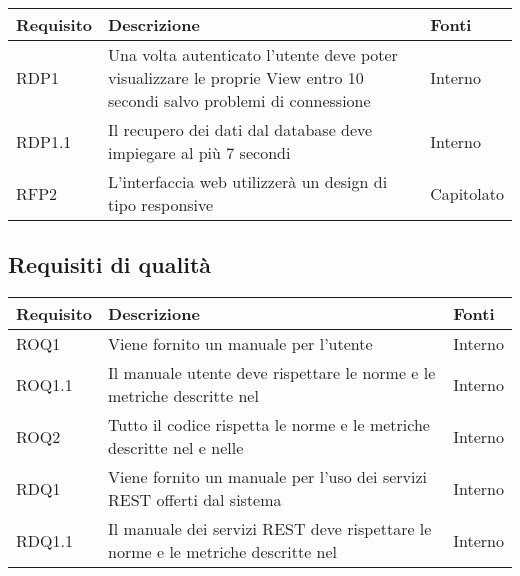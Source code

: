 \begin{center}

	\def\arraystretch{1.5}
	\bgroup
	\begin{longtable}{| p{2.5cm} | p{8cm} | p{2cm} |}

		\hline
		\textbf{Requisito} & \textbf{Descrizione} & \textbf{Fonti} \\
		\hline

		RDP1  &  Una volta autenticato l'utente deve poter visualizzare le proprie View entro 10 secondi salvo problemi di connessione &  Interno \\
		\hline
		RDP1.1  &  Il recupero dei dati dal database deve impiegare al più 7 secondi  &  Interno \\
		\hline
		RFP2  &  L'interfaccia web utilizzerà un design di tipo responsive  &  Capitolato \\
		\hline

	\end{longtable}
	\egroup
\end{center}

\subsection{Requisiti di qualità}

\begin{center}

	\def\arraystretch{1.5}
	\bgroup
	\begin{longtable}{| p{2.5cm} | p{8cm} | p{2cm} |}

		\hline
		\textbf{Requisito} & \textbf{Descrizione} & \textbf{Fonti} \\
		\hline

		ROQ1  &  Viene fornito un manuale per l'utente  &  Interno \\
		\hline
		ROQ1.1  &  Il manuale utente deve rispettare le norme e le metriche descritte nel \docNameVersionPdQ  &  Interno \\
		\hline
		ROQ2  &  Tutto il codice rispetta le norme e le metriche descritte nel \docNameVersionPdQ{} e nelle \docNameVersionNdP  &  Interno \\
		\hline
		RDQ1  &  Viene fornito un manuale per l'uso dei servizi REST offerti dal sistema  &  Interno \\
		\hline
		RDQ1.1  &  Il manuale dei servizi REST deve rispettare le norme e le metriche descritte nel \docNameVersionPdQ  &  Interno \\
		\hline


	\end{longtable}
	\egroup
\end{center}

